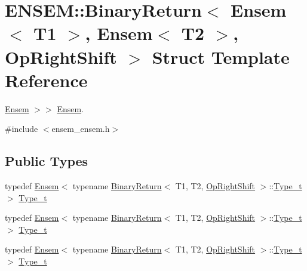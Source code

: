 \hypertarget{structENSEM_1_1BinaryReturn_3_01Ensem_3_01T1_01_4_00_01Ensem_3_01T2_01_4_00_01OpRightShift_01_4}{}\section{E\+N\+S\+EM\+:\+:Binary\+Return$<$ Ensem$<$ T1 $>$, Ensem$<$ T2 $>$, Op\+Right\+Shift $>$ Struct Template Reference}
\label{structENSEM_1_1BinaryReturn_3_01Ensem_3_01T1_01_4_00_01Ensem_3_01T2_01_4_00_01OpRightShift_01_4}


\mbox{\hyperlink{classENSEM_1_1Ensem}{Ensem}} $>$$>$ \mbox{\hyperlink{classENSEM_1_1Ensem}{Ensem}}.  




{\ttfamily \#include $<$ensem\+\_\+ensem.\+h$>$}

\subsection*{Public Types}
\begin{DoxyCompactItemize}
\item 
typedef \mbox{\hyperlink{classENSEM_1_1Ensem}{Ensem}}$<$ typename \mbox{\hyperlink{structENSEM_1_1BinaryReturn}{Binary\+Return}}$<$ T1, T2, \mbox{\hyperlink{structENSEM_1_1OpRightShift}{Op\+Right\+Shift}} $>$\+::\mbox{\hyperlink{structENSEM_1_1BinaryReturn_3_01Ensem_3_01T1_01_4_00_01Ensem_3_01T2_01_4_00_01OpRightShift_01_4_a5f572b84bf6bd1cdf73ee915255349dc}{Type\+\_\+t}} $>$ \mbox{\hyperlink{structENSEM_1_1BinaryReturn_3_01Ensem_3_01T1_01_4_00_01Ensem_3_01T2_01_4_00_01OpRightShift_01_4_a5f572b84bf6bd1cdf73ee915255349dc}{Type\+\_\+t}}
\item 
typedef \mbox{\hyperlink{classENSEM_1_1Ensem}{Ensem}}$<$ typename \mbox{\hyperlink{structENSEM_1_1BinaryReturn}{Binary\+Return}}$<$ T1, T2, \mbox{\hyperlink{structENSEM_1_1OpRightShift}{Op\+Right\+Shift}} $>$\+::\mbox{\hyperlink{structENSEM_1_1BinaryReturn_3_01Ensem_3_01T1_01_4_00_01Ensem_3_01T2_01_4_00_01OpRightShift_01_4_a5f572b84bf6bd1cdf73ee915255349dc}{Type\+\_\+t}} $>$ \mbox{\hyperlink{structENSEM_1_1BinaryReturn_3_01Ensem_3_01T1_01_4_00_01Ensem_3_01T2_01_4_00_01OpRightShift_01_4_a5f572b84bf6bd1cdf73ee915255349dc}{Type\+\_\+t}}
\item 
typedef \mbox{\hyperlink{classENSEM_1_1Ensem}{Ensem}}$<$ typename \mbox{\hyperlink{structENSEM_1_1BinaryReturn}{Binary\+Return}}$<$ T1, T2, \mbox{\hyperlink{structENSEM_1_1OpRightShift}{Op\+Right\+Shift}} $>$\+::\mbox{\hyperlink{structENSEM_1_1BinaryReturn_3_01Ensem_3_01T1_01_4_00_01Ensem_3_01T2_01_4_00_01OpRightShift_01_4_a5f572b84bf6bd1cdf73ee915255349dc}{Type\+\_\+t}} $>$ \mbox{\hyperlink{structENSEM_1_1BinaryReturn_3_01Ensem_3_01T1_01_4_00_01Ensem_3_01T2_01_4_00_01OpRightShift_01_4_a5f572b84bf6bd1cdf73ee915255349dc}{Type\+\_\+t}}
\end{DoxyCompactItemize}


